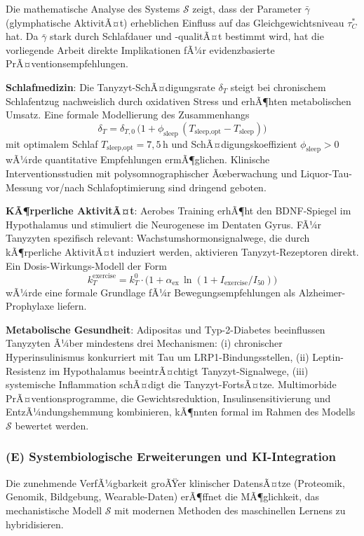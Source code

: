 ﻿\documentclass[12pt,a4paper]{article}
\theoremstyle{definition}
\begin{document}
	Die mathematische Analyse des Systems $\mathcal{S}$ zeigt, dass der Parameter $\bar{\gamma}$ (glymphatische AktivitÃ¤t) erheblichen Einfluss auf das Gleichgewichtsniveau $\tau_C^*$ hat. Da $\bar{\gamma}$ stark durch Schlafdauer und -qualitÃ¤t bestimmt wird, hat die vorliegende Arbeit direkte Implikationen fÃ¼r evidenzbasierte PrÃ¤ventionsempfehlungen.

	\textbf{Schlafmedizin}: Die Tanyzyt-SchÃ¤digungsrate $\delta_T$ steigt bei chronischem Schlafentzug nachweislich durch oxidativen Stress und erhÃ¶hten metabolischen Umsatz. Eine formale Modellierung des Zusammenhangs
	\[
	\delta_T = \delta_{T,0}\,\bigl(1 + \phi_{\text{sleep}}\,(T_{\text{sleep,opt}} - T_{\text{sleep}})\bigr)
	\]
	mit optimalem Schlaf $T_{\text{sleep,opt}} = 7{,}5\,\text{h}$ und SchÃ¤digungskoeffizient $\phi_{\text{sleep}} > 0$ wÃ¼rde quantitative Empfehlungen ermÃ¶glichen. Klinische Interventionsstudien mit polysomnographischer Ãœberwachung und Liquor-Tau-Messung vor/nach Schlafoptimierung sind dringend geboten.

	\textbf{KÃ¶rperliche AktivitÃ¤t}: Aerobes Training erhÃ¶ht den BDNF-Spiegel im Hypothalamus und stimuliert die Neurogenese im Dentaten Gyrus. FÃ¼r Tanyzyten spezifisch relevant: Wachstumshormonsignalwege, die durch kÃ¶rperliche AktivitÃ¤t induziert werden, aktivieren Tanyzyt-Rezeptoren direkt. Ein Dosis-Wirkungs-Modell der Form
	\[
	k_T^{\text{exercise}} = k_T^0 \cdot \bigl(1 + \alpha_{\text{ex}}\, \ln(1 + I_{\text{exercise}}/I_{50})\bigr)
	\]
	wÃ¼rde eine formale Grundlage fÃ¼r Bewegungsempfehlungen als Alzheimer-Prophylaxe liefern.

	\textbf{Metabolische Gesundheit}: Adipositas und Typ-2-Diabetes beeinflussen Tanyzyten Ã¼ber mindestens drei Mechanismen: (i) chronischer Hyperinsulinismus konkurriert mit Tau um LRP1-Bindungsstellen, (ii) Leptin-Resistenz im Hypothalamus beeintrÃ¤chtigt Tanyzyt-Signalwege, (iii) systemische Inflammation schÃ¤digt die Tanyzyt-FortsÃ¤tze. Multimorbide PrÃ¤ventionsprogramme, die Gewichtsreduktion, Insulinsensitivierung und EntzÃ¼ndungshemmung kombinieren, kÃ¶nnten formal im Rahmen des Modells $\mathcal{S}$ bewertet werden.

	\subsubsection*{(E) Systembiologische Erweiterungen und KI-Integration}

	Die zunehmende VerfÃ¼gbarkeit groÃŸer klinischer DatensÃ¤tze (Proteomik, Genomik, Bildgebung, Wearable-Daten) erÃ¶ffnet die MÃ¶glichkeit, das mechanistische Modell $\mathcal{S}$ mit modernen Methoden des maschinellen Lernens zu hybridisieren.
\end{document}
